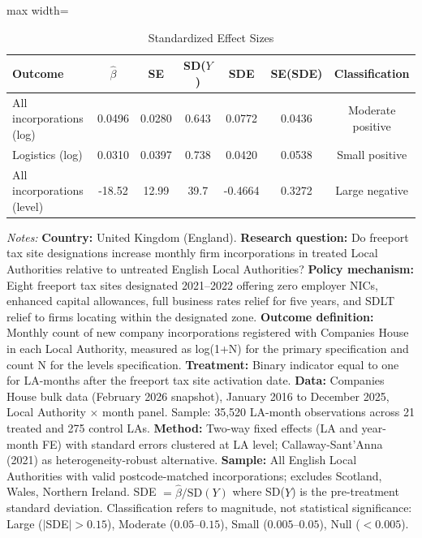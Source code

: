 \begin{table}[htbp]
\centering
\caption{Standardized Effect Sizes}
\label{tab:sde}
\begin{adjustbox}{max width=\textwidth}
\begin{tabular}{lcccccc}
\hline\hline
Outcome & $\hat{\beta}$ & SE & SD($Y$) & SDE & SE(SDE) & Classification \\
\hline
All incorporations (log) & 0.0496 & 0.0280 & 0.643 & 0.0772 & 0.0436 & Moderate positive \\
Logistics (log) & 0.0310 & 0.0397 & 0.738 & 0.0420 & 0.0538 & Small positive \\
All incorporations (level) & -18.52 & 12.99 & 39.7 & -0.4664 & 0.3272 & Large negative \\
\hline\hline
\end{tabular}
\end{adjustbox}
\begin{tablenotes}[flushleft]
\small
\item \textit{Notes:} \textbf{Country:} United Kingdom (England). \textbf{Research question:} Do freeport tax site designations increase monthly firm incorporations in treated Local Authorities relative to untreated English Local Authorities? \textbf{Policy mechanism:} Eight freeport tax sites designated 2021--2022 offering zero employer NICs, enhanced capital allowances, full business rates relief for five years, and SDLT relief to firms locating within the designated zone. \textbf{Outcome definition:} Monthly count of new company incorporations registered with Companies House in each Local Authority, measured as log(1+N) for the primary specification and count N for the levels specification. \textbf{Treatment:} Binary indicator equal to one for LA-months after the freeport tax site activation date. \textbf{Data:} Companies House bulk data (February 2026 snapshot), January 2016 to December 2025, Local Authority $\times$ month panel. Sample: 35,520 LA-month observations across 21 treated and 275 control LAs. \textbf{Method:} Two-way fixed effects (LA and year-month FE) with standard errors clustered at LA level; Callaway-Sant'Anna (2021) as heterogeneity-robust alternative. \textbf{Sample:} All English Local Authorities with valid postcode-matched incorporations; excludes Scotland, Wales, Northern Ireland. SDE $= \hat{\beta} / \text{SD}(Y)$ where SD($Y$) is the pre-treatment standard deviation. Classification refers to magnitude, not statistical significance: Large ($|$SDE$| > 0.15$), Moderate ($0.05$--$0.15$), Small ($0.005$--$0.05$), Null ($< 0.005$).
\end{tablenotes}
\end{table}
